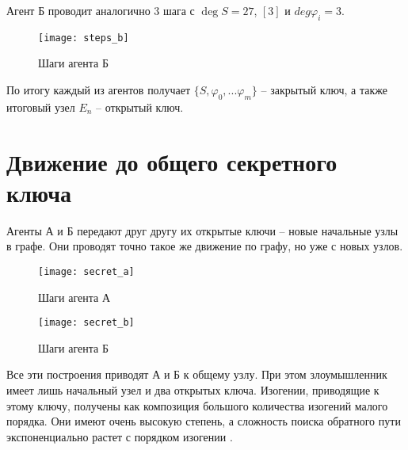 Агент Б проводит аналогично 3 шага с $\deg S = 27$, $[3]$ и $deg \varphi_i = 3$.

\begin{figure}[ht]
	\centering
	\texttt{[image: steps\_b]}
	\caption{Шаги агента Б}
	\label{fig:steps_b}
\end{figure}

По итогу каждый из агентов получает $\{ S, \varphi_0, ... \varphi_m \}$ -- закрытый ключ, а также итоговый узел $E_n$ -- открытый ключ.

\section{Движение до общего секретного ключа}

Агенты А и Б передают друг другу их открытые ключи -- новые начальные узлы в графе. Они проводят точно такое же движение по графу, но уже с новых узлов.

\begin{figure}[ht]
	\centering
	\texttt{[image: secret\_a]}
	\caption{Шаги агента А}
	\label{fig:secret_a}
\end{figure}

\begin{figure}[ht]
	\centering
	\texttt{[image: secret\_b]}
	\caption{Шаги агента Б}
	\label{fig:secret_b}
\end{figure}

Все эти построения приводят А и Б к общему узлу. При этом злоумышленник имеет лишь начальный узел и два открытых ключа. Изогении, приводящие к этому ключу, получены как композиция большого количества изогений малого порядка. Они имеют очень высокую степень, а сложность поиска обратного пути экспоненциально растет с порядком изогении \cite{isogenies}.

\endinput
